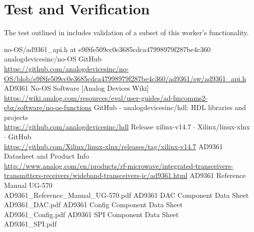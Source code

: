 \documentclass{article}
\begin{document}
\section*{Test and Verification}
The test outlined in \cite{dac_comp_datasheet} includes validation of a subset of this worker's functionality.

\begin{thebibliography}{1}

 no-OS/ad9361\_api.h at e9f8fe509cc0e3685cdca47998979f287be4c360 analogdevicesinc/no-OS GitHub\\
\url{https://github.com/analogdevicesinc/no-OS/blob/e9f8fe509cc0e3685cdca47998979f287be4c360/ad9361/sw/ad9361_api.h}
 AD9361 No-OS Software [Analog Devices Wiki]\\
\url{https://wiki.analog.com/resources/eval/user-guides/ad-fmcomms2-ebz/software/no-os-functions}
 GitHub - analogdevicesinc/hdl: HDL libraries and projects \\
\url{https://github.com/analogdevicesinc/hdl}
 Release xilinx-v14.7 $\cdot$ Xilinx/linux-xlnx $\cdot$ GitHub \\
\url{https://github.com/Xilinx/linux-xlnx/releases/tag/xilinx-v14.7}
 AD9361 Datasheet and Product Info \\
\url{http://www.analog.com/en/products/rf-microwave/integrated-transceivers-transmitters-receivers/wideband-transceivers-ic/ad9361.html}
 AD9361 Reference Manual UG-570\\
AD9361\_Reference\_Manual\_UG-570.pdf
 AD9361 DAC Component Data Sheet \\AD9361\_DAC.pdf
 AD9361 Config Component Data Sheet \\AD9361\_Config.pdf
 AD9361 SPI Component Data Sheet \\AD9361\_SPI.pdf
 
\end{thebibliography}
\end{document}
